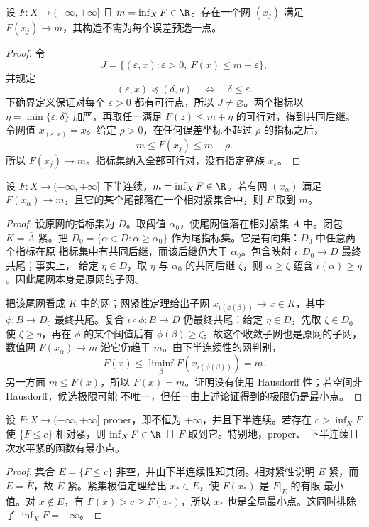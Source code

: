 \begin{proposition}[无选择的近似极小网]\label{proposition:1-2-3-minimizing-net}
设 \(F:X\to(-\infty,+\infty]\) 且 \(m=\inf_XF\in\R\)。存在一个网 \((x_j)\) 满足
\(F(x_j)\to m\)，其构造不需为每个误差预选一点。
\end{proposition}
\begin{proof}
令
\[
 J=\{(\varepsilon,x):\varepsilon>0,\ F(x)\le m+\varepsilon\},
\]
并规定
\[
 (\varepsilon,x)\preceq(\delta,y)\quad\Longleftrightarrow\quad\delta\le\varepsilon.
\]
下确界定义保证对每个 \(\varepsilon>0\) 都有可行点，所以 \(J\ne\varnothing\)。两个指标以
\(\eta=\min\{\varepsilon,\delta\}\) 加严，再取任一满足 \(F(z)\le m+\eta\) 的可行对，得到共同后继。
令网值 \(x_{(\varepsilon,x)}=x\)。给定 \(\rho>0\)，在任何误差坐标不超过 \(\rho\) 的指标之后，
\[
 m\le F(x_j)\le m+\rho.
\]
所以 \(F(x_j)\to m\)。指标集纳入全部可行对，没有指定整族 \(x_\varepsilon\)。
\end{proof}

\begin{theorem}[直接法原型]\label{theorem:1-2-3-4}
设 \(F:X\to(-\infty,+\infty]\) 下半连续，\(m=\inf_XF\in\R\)。若有网 \((x_\alpha)\) 满足
\(F(x_\alpha)\to m\)，且它的某个尾部落在一个相对紧集合中，则 \(F\) 取到 \(m\)。
\end{theorem}
\begin{proof}
设原网的指标集为 \(D\)。取阈值 \(\alpha_0\)，使尾网值落在相对紧集 \(A\) 中。闭包
\(K=\overline A\) 紧。把
\(D_0=\{\alpha\in D:\alpha\ge\alpha_0\}\) 作为尾指标集。它是有向集：\(D_0\) 中任意两个指标在原
指标集中有共同后继，而该后继仍大于 \(\alpha_0\)。包含映射 \(\iota:D_0\to D\) 最终共尾；事实上，
给定 \(\eta\in D\)，取 \(\eta\) 与 \(\alpha_0\) 的共同后继 \(\zeta\)，则
\(\alpha\ge\zeta\) 蕴含 \(\iota(\alpha)\ge\eta\)。因此尾网本身是原网的子网。

把该尾网看成 \(K\) 中的网；网紧性定理给出子网
\(x_{\iota(\phi(\beta))}\to x\in K\)，其中 \(\phi:B\to D_0\) 最终共尾。复合
\(\iota\circ\phi:B\to D\) 仍最终共尾：给定 \(\eta\in D\)，先取
\(\zeta\in D_0\) 使 \(\zeta\ge\eta\)，再在 \(\phi\) 的某个阈值后有
\(\phi(\beta)\ge\zeta\)。故这个收敛子网也是原网的子网，数值网
\(F(x_\alpha)\to m\) 沿它仍趋于 \(m\)。由下半连续性的网判别，
\[
 F(x)\le\liminf_\beta F(x_{\iota(\phi(\beta))})=m.
\]
另一方面 \(m\le F(x)\)，所以 \(F(x)=m\)。证明没有使用 Hausdorff 性；若空间非 Hausdorff，候选极限可能
不唯一，但任一由上述论证得到的极限仍是最小点。
\end{proof}

\begin{corollary}[次水平紧版直接法]\label{corollary:1-2-3-infcompact}
设 \(F:X\to(-\infty,+\infty]\) proper，即不恒为 \(+\infty\)，并且下半连续。若存在
\(c>\inf_XF\) 使 \(\{F\le c\}\) 相对紧，则 \(\inf_XF\in\R\) 且 \(F\) 取到它。特别地，proper、
下半连续且次水平紧的函数有最小点。
\end{corollary}
\begin{proof}
集合 \(E=\{F\le c\}\) 非空，并由下半连续性知其闭。相对紧性说明 \(\overline E\) 紧，而
\(E=\overline E\)，故 \(E\) 紧。紧集极值定理给出 \(x_*\in E\)，使 \(F(x_*)\) 是 \(F|_E\) 的有限
最小值。对 \(x\notin E\)，有 \(F(x)>c\ge F(x_*)\)，所以 \(x_*\) 也是全局最小点。这同时排除了
\(\inf_XF=-\infty\)。
\end{proof}

